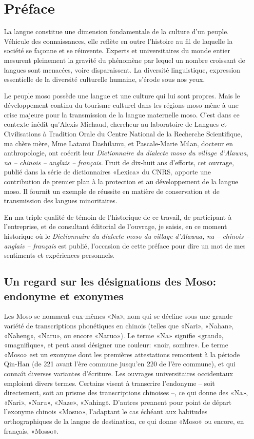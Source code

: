 \languefra

\chapter*{Préface}

La langue constitue une dimension fondamentale de la culture d’un peuple. Véhicule des connaissances, elle reflète en outre l’histoire au fil de laquelle la société se façonne et se réinvente. Experts et universitaires du monde entier mesurent pleinement la gravité du phénomène par lequel un nombre croissant de langues sont menacées, voire disparaissent. La diversité linguistique, expression essentielle de la diversité culturelle humaine, s'érode sous nos yeux.

Le peuple moso possède une langue et une culture qui lui sont propres. Mais le développement continu du tourisme culturel dans les régions moso mène à une crise majeure pour la transmission de la langue maternelle moso. C’est dans ce contexte inédit qu’Alexis Michaud, chercheur au laboratoire de Langues et Civilisations à Tradition Orale du Centre National de la Recherche Scientifique, ma chère mère, Mme Latami Dashilamu, et Pascale-Marie Milan, docteur en anthropologie, ont coécrit leur \emph{Dictionnaire du dialecte moso du village d'Alawua, na – chinois – anglais – français}. Fruit de dix-huit ans d’efforts, cet ouvrage, publié dans la série de dictionnaires «Lexica» du CNRS, apporte une contribution de premier plan à la protection et au développement de la langue moso. Il fournit un exemple de réussite en matière de conservation et de transmission des langues minoritaires.

En ma triple qualité de témoin de l’historique de ce travail, de participant à l’entreprise, et de consultant éditorial de l’ouvrage, je saisis, en ce moment historique où le \emph{Dictionnaire du dialecte moso du village d'Alawua, na – chinois – anglais – français} est publié, l’occasion de cette préface pour dire un mot de mes sentiments et expériences personnels.

\section*{Un regard sur les désignations des Moso: endonyme et exonymes}

Les Moso se nomment eux-mêmes «Na», nom qui se décline sous une grande variété de transcriptions phonétiques en chinois (telles que «Nari», «Nahan», «Naheng», «Naru», ou encore «Naruo»). Le terme «Na» signifie «grand», «magnifique», et peut aussi désigner une couleur: «noir, sombre». Le terme «Moso» est un exonyme dont les premières attestations remontent à la période Qin-Han (de 221 avant l’ère commune jusqu’en 220 de l’ère commune), et qui connaît diverses variantes d’écriture. Les ouvrages universitaires occidentaux emploient divers termes. Certains visent à transcrire l’endonyme – soit directement, soit au prisme des transcriptions chinoises –, ce qui donne des «Na», «Nari», «Naru», «Naze», «Nahing». D’autres prennent pour point de départ l’exonyme chinois  «Mosuo», l’adaptant le cas échéant aux habitudes orthographiques de la langue de destination, ce qui donne «Moso» ou encore, en français, «Mosso».


